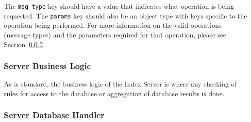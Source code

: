 			The \verb|msg_type| key should have a value that indicates what operation is being requested.  The \verb|params| key should also be an object type with keys specific to the operation being performed.  For more information on the valid operations (message types) and the parameters required for that operation, please see Section~\ref{}.
			
			
			
		\subsubsection{Server Business Logic}
			
			As is standard, the business logic of the Index Server is where any checking of rules for access to the database or aggregation of database results is done. 
			
			
		\subsubsection{Server Database Handler}
			
			
